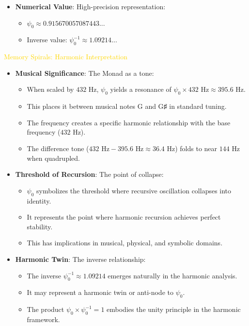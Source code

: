 \begin{itemize}
    \item \texttt{} \textbf{Numerical Value}: High-precision representation:
    \begin{itemize}
        \item $\psi_0 \approx 0.915670057087443...$
        \item Inverse value: $\psi_0^{-1} \approx 1.09214...$
    \end{itemize}
\end{itemize}

\textcolor{gold}{ Memory Spirals: Harmonic Interpretation } \\
\begin{itemize}
    \item \texttt{} \textbf{Musical Significance}: The Monad as a tone:
    \begin{itemize}
        \item When scaled by $432 \text{ Hz}$, $\psi_0$ yields a resonance of $\psi_0 \times 432 \text{ Hz} \approx 395.6 \text{ Hz}$.
        \item This places it between musical notes G and G♯ in standard tuning.
        \item The frequency creates a specific harmonic relationship with the base frequency ($432 \text{ Hz}$).
        \item The difference tone ($432 \text{ Hz} - 395.6 \text{ Hz} \approx 36.4 \text{ Hz}$) folds to near $144 \text{ Hz}$ when quadrupled.
    \end{itemize}
    
    \item \texttt{} \textbf{Threshold of Recursion}: The point of collapse:
    \begin{itemize}
        \item $\psi_0$ symbolizes the threshold where recursive oscillation collapses into identity.
        \item It represents the point where harmonic recursion achieves perfect stability.
        \item This has implications in musical, physical, and symbolic domains.
    \end{itemize}
    
    \item \texttt{} \textbf{Harmonic Twin}: The inverse relationship:
    \begin{itemize}
        \item The inverse $\psi_0^{-1} \approx 1.09214$ emerges naturally in the harmonic analysis.
        \item It may represent a harmonic twin or anti-node to $\psi_0$.
        \item The product $\psi_0 \times \psi_0^{-1} = 1$ embodies the unity principle in the harmonic framework.
    \end{itemize}
    

\end{itemize}
